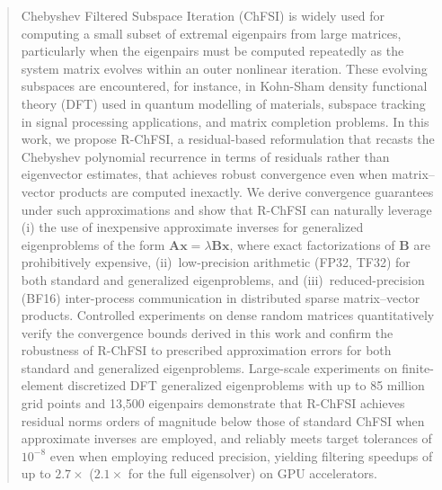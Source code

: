 \documentclass[preprint,3p,number,sort&compress]{elsarticle}
\newcommand{\bx}{\textbf{x}}
\newcommand{\bA}{\textbf{A}}
\newcommand{\bB}{\textbf{B}}
\newcommand{\cblue }{\color{black}}
\newcommand{\cn}{\color{black}}
\begin{document}
\begin{frontmatter}
\begin{abstract}
{\cblue Chebyshev Filtered Subspace Iteration (ChFSI) is widely used for computing a small subset of extremal eigenpairs from large matrices, particularly when the eigenpairs must be computed repeatedly as the system matrix evolves within an outer nonlinear iteration. These evolving subspaces are encountered, for instance, in Kohn-Sham density functional theory (DFT) used in quantum modelling of materials, subspace tracking in signal processing applications, and matrix completion problems. In this work, we propose R-ChFSI, a residual-based reformulation that recasts the Chebyshev polynomial recurrence in terms of residuals rather than eigenvector estimates, that achieves robust convergence even when matrix--vector products are computed inexactly. We derive convergence guarantees under such approximations and show that R-ChFSI can naturally leverage (i) the use of inexpensive approximate inverses for generalized eigenproblems of the form $\bA \bx = \lambda \bB \bx$, where exact factorizations of $\bB$ are prohibitively expensive, (ii)~low-precision arithmetic (FP32, TF32) for both standard and generalized eigenproblems, and (iii)~reduced-precision (BF16) inter-process communication in distributed sparse matrix--vector products. Controlled experiments on dense random matrices quantitatively verify the convergence bounds derived in this work and confirm the robustness of R-ChFSI to prescribed approximation errors for both standard and generalized eigenproblems. Large-scale experiments on finite-element discretized DFT generalized eigenproblems with up to 85 million grid points and 13,500 eigenpairs demonstrate that R-ChFSI achieves residual norms orders of magnitude below those of standard ChFSI when approximate inverses are employed, and reliably meets target tolerances of $10^{-8}$ even when employing reduced precision, yielding filtering speedups of up to $2.7{\times}$ ($2.1{\times}$ for the full eigensolver) on GPU accelerators.\cn}


\end{abstract}
\end{frontmatter}
\end{document}
